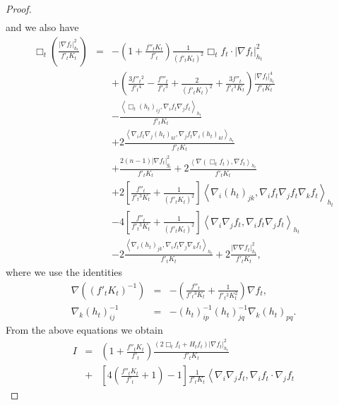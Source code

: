 \documentclass{amsart}
\theoremstyle{definition}
\theoremstyle{remark}
\numberwithin{equation}{section}
\begin{document}
\begin{proof}
\begin{eqnarray*}
\end{eqnarray*}
and we also have
\begin{eqnarray*}
\Box_{t}\left(\frac{|\nabla f_{t}|^{2}_{h_{t}}}{f'_{t}K_{t}}\right)
&=&-\left(1+\frac{f''_{t}K_{t}}{f'_{t}}\right)\frac{1}{(f'_{t}K_{t})^{2}}\Box_{t}
f_{t}\cdot|\nabla f_{t}|^{2}_{h_{t}}\\
&&+\left(\frac{3f''_{t}{}^{2}}{f'_{t}{}^{4}}-\frac{f'''_{t}}{f'_{t}{}^{3}}
+\frac{2}{(f'_{t}K_{t})^{2}}+\frac{3f''_{t}}{f'_{t}{}^{3}K_{t}}
\right)\frac{|\nabla f_{t}|^{4}_{h_{t}}}{f'_{t}K_{t}}\\
&&-\frac{\left\langle\Box_{t} (h_{t})_{ij},
\nabla_{i}f_{t}\nabla_{j}f_{t}\right\rangle_{h_{t}}}{f'_{t}K_{t}}\\
&&+2\frac{\left\langle\nabla_{i}f_{t}\nabla_{j}(h_{t})_{kl},
\nabla_{j}f_{t}\nabla_{i}(h_{t})_{kl}\right\rangle_{h_{t}}}{f'_{t}K_{t}}\\
&&+\frac{2(n-1)|\nabla f_{t}|^{2}_{g_{t}}}{f'_{t}K_{t}}+2\frac{\left\langle\nabla(\Box_{t} f_{t}),\nabla f_{t}
\right\rangle_{h_{t}}}{f'_{t}K_{t}}\\
&&+2\left[\frac{f''_{t}}{f'_{t}{}^{3}K_{t}}+\frac{1}{(f'_{t}K_{t})^{2}}
\right]\left\langle\nabla_{i}(h_{t})_{jk},\nabla_{i}f_{t}\nabla_{j}f_{t}
\nabla_{k}f_{t}\right\rangle_{h_{t}}\\
&&-4\left[\frac{f''_{t}}{f'_{t}{}^{3}K_{t}}+\frac{1}{(f'_{t}K_{t})^{2}}
\right]\left\langle\nabla_{i}\nabla_{j}f_{t},\nabla_{i}f_{t}\nabla_{j}f_{t}
\right\rangle_{h_{t}}\\
&&-2\frac{\left\langle\nabla_{i}(h_{t})_{jk},\nabla_{i}f_{t}
\nabla_{j}\nabla_{k}f_{t}
\right\rangle_{h_{t}}}{f'_{t}K_{t}}
+2\frac{|\nabla\nabla f_{t}|^{2}_{h_{t}}}{f'_{t}K_{t}},
\end{eqnarray*}
where we use the identities
\begin{eqnarray*}
\nabla\left((f'_{t}K_{t})^{-1}\right)&=&-\left(\frac{f''_{t}}{f'_{t}{}^{3}K_{t}}
+\frac{1}{f'_{t}{}^{2}K^{2}_{t}}\right)\nabla f_{t},\\
\nabla_{k}(h_{t})^{-1}_{ij}&=&-(h_{t})^{-1}_{ip}(h_{t})^{-1}_{jq}\nabla_{k}(h_{t})_{pq}.
\end{eqnarray*}
From the above equations we obtain
\begin{eqnarray*}
I&=&\left(1
+\frac{f''_{t}K_{t}}{f'_{t}}\right)
\frac{(2\Box_{t} f_{t}+H_{t}f_{t})|\nabla f_{t}|^{2}_{h_{t}}}{f'_{t}K_{t}}\\
&+&\left[4\left(\frac{f''_{t}K_{t}}{f'_{t}}+1\right)-1\right]\frac{1}{f'_{t}K_{t}}
\left\langle\nabla_{i}\nabla_{j}f_{t},\nabla_{i}f_{t}\cdot\nabla_{j}f_{t}

\end{eqnarray*}
\end{proof}
\end{document}
